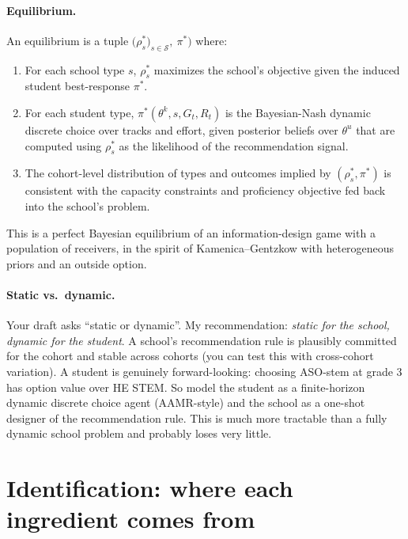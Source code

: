 \documentclass{article}
\begin{document}
\paragraph{Equilibrium.}  An equilibrium is a tuple
$\big(\rho_s^*\big)_{s \in \mathcal{S}},\ \pi^*\big)$ where:
\begin{enumerate}[leftmargin=*]
  \item For each school type $s$, $\rho_s^*$ maximizes the school's objective
  given the induced student best-response $\pi^*$.
  \item For each student type, $\pi^*(\theta^k, s, G_t, R_t)$ is the
  Bayesian-Nash dynamic discrete choice over tracks and effort, given
  posterior beliefs over $\theta^u$ that are computed using $\rho_s^*$ as
  the likelihood of the recommendation signal.
  \item The cohort-level distribution of types and outcomes implied by
  $(\rho_s^*, \pi^*)$ is consistent with the capacity constraints and
  proficiency objective fed back into the school's problem.
\end{enumerate}
This is a perfect Bayesian equilibrium of an information-design game with
a population of receivers, in the spirit of Kamenica--Gentzkow with
heterogeneous priors and an outside option.

\paragraph{Static vs.\ dynamic.}  Your draft asks ``static or dynamic''. My
recommendation: \emph{static for the school, dynamic for the student}. A
school's recommendation rule is plausibly committed for the cohort and stable
across cohorts (you can test this with cross-cohort variation). A student is
genuinely forward-looking: choosing ASO-stem at grade 3 has option value over
HE STEM. So model the student as a finite-horizon dynamic discrete choice
agent (AAMR-style) and the school as a one-shot designer of the
recommendation rule. This is much more tractable than a fully dynamic
school problem and probably loses very little.

\section{Identification: where each ingredient comes from}
\end{document}
